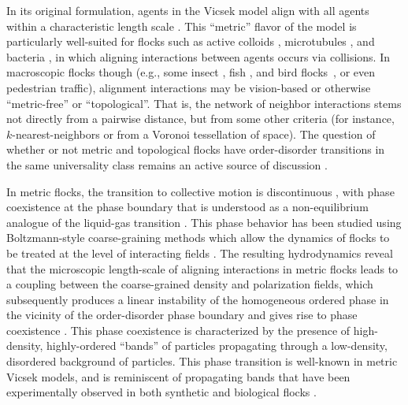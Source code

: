 \documentclass[twoside,twocolumn,9pt]{article}
\begin{document}
In its original formulation, agents in the Vicsek model align with all agents within a characteristic length scale \cite{chate2008collective}.
This ``metric'' flavor of the model is particularly well-suited for flocks such as active colloids \cite{bricard2013emergence}, microtubules \cite{sumino2012large}, and bacteria \cite{chen2017weak}, in which aligning interactions between agents occurs via collisions.
In macroscopic flocks though (e.g., some insect \cite{buhl2011group}, fish \cite{lopez2012behavioural}, and bird flocks~\cite{ballerini2008interaction}, or even pedestrian traffic\cite{ma2010k}), alignment interactions may be vision-based or otherwise ``metric-free'' \cite{ginelli2010relevance} or ``topological''.
That is, the network of neighbor interactions stems not directly from a pairwise distance, but from some other criteria (for instance, $k$-nearest-neighbors\cite{bhattacherjee2014cyclic,bhattacherjee2015topological,chen2017minimum,zhang2023enhancing} or from a Voronoi tessellation\cite{ginelli2010relevance,schubring2013density,rahmani2021topological,schilling2022scalability} of space).
The question of whether or not metric and topological flocks have order-disorder transitions in the same universality class remains an active source of discussion \cite{barberis2014evidence,martin2021fluctuation,martin2024fluctuation}.

In metric flocks, the transition to collective motion is discontinuous \cite{chate2008collective}, with phase coexistence at the phase boundary that is understood as a non-equilibrium analogue of the liquid-gas transition \cite{solon2015phase}.
This phase behavior has been studied using Boltzmann-style coarse-graining methods which allow the dynamics of flocks to be treated at the level of interacting fields \cite{bertin2006boltzmann,peshkov2014boltzmann}.
The resulting hydrodynamics reveal that the microscopic length-scale of aligning interactions in metric flocks leads to a coupling between the coarse-grained density and polarization fields, which subsequently produces a linear instability of the homogeneous ordered phase in the vicinity of the order-disorder phase boundary and gives rise to phase coexistence \cite{solon2015pattern}.
This phase coexistence is characterized by the presence of high-density, highly-ordered ``bands'' of particles propagating through a low-density, disordered background of particles\cite{mishra2010fluctuations,yamanaka2014formation,mangeat2020flocking}.
This phase transition is well-known in metric Vicsek models, and is reminiscent of propagating bands that have been experimentally observed in both synthetic \cite{bricard2013emergence} and biological flocks \cite{buhl2011group}.
\end{document}
